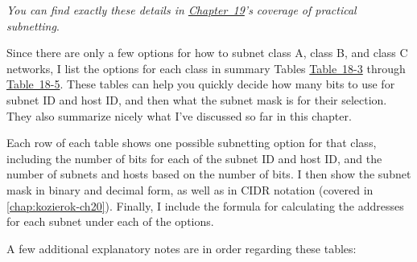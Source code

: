 {\emph{You can find exactly these details in
\protect\hyperlink{ch19.html}{Chapter~19}'s coverage of practical
subnetting}}.

\protect\hypertarget{ch18s07.html}{}{}

\protect\hypertarget{ch18s07.htmlux5cux23idx-CHP-18-0741}{}{}Since there
are only a few options for how to subnet class A, class B, and class C
networks, I list the options for each class in summary Tables
\protect\hyperlink{ch18s07.htmlux5cux23subnetting_summary_table_for_class_a_net}{Table~18-3}
through
\protect\hyperlink{ch18s07.htmlux5cux23subnetting_summary_table_for_class_c_net}{Table~18-5}.
These tables can help you quickly decide how many bits to use for subnet
ID and host ID, and then what the subnet mask is for their selection.
They also summarize nicely what I've discussed so far in this chapter.

Each row of each table shows one possible subnetting option for that
class, including the number of bits for each of the subnet ID and host
ID, and the number of subnets and hosts based on the number of bits. I
then show the subnet mask in binary and decimal form, as well as in CIDR
notation (covered in \vref{chap:kozierok-ch20}).
Finally, I include the formula for calculating the addresses for each
subnet under each of the options.

A few additional explanatory notes are in order regarding these tables:

